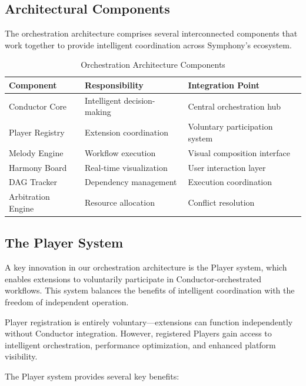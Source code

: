 \subsection*{Architectural Components}

The orchestration architecture comprises several interconnected components that work together to provide intelligent coordination across Symphony's ecosystem.

\begin{table}[ht]
\centering
\begin{tabular}{@{}lll@{}}
\toprule
\textbf{Component} & \textbf{Responsibility} & \textbf{Integration Point} \\
\midrule
Conductor Core & Intelligent decision-making & Central orchestration hub \\
Player Registry & Extension coordination & Voluntary participation system \\
Melody Engine & Workflow execution & Visual composition interface \\
Harmony Board & Real-time visualization & User interaction layer \\
DAG Tracker & Dependency management & Execution coordination \\
Arbitration Engine & Resource allocation & Conflict resolution \\
\bottomrule
\end{tabular}
\caption{Orchestration Architecture Components}
\end{table}

\subsection*{The Player System}

A key innovation in our orchestration architecture is the Player system, which enables extensions to voluntarily participate in Conductor-orchestrated workflows. This system balances the benefits of intelligent coordination with the freedom of independent operation.

\begin{alertbox}
Player registration is entirely voluntary—extensions can function independently without Conductor integration. However, registered Players gain access to intelligent orchestration, performance optimization, and enhanced platform visibility.
\end{alertbox}

The Player system provides several key benefits:

